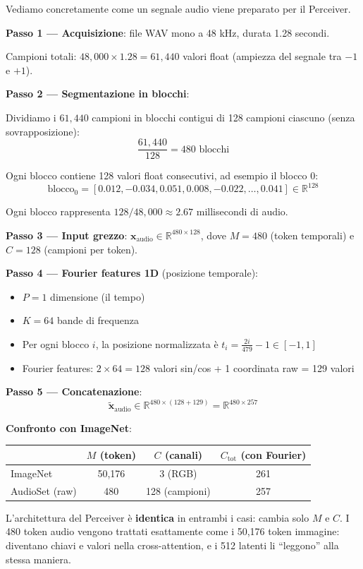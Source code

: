\documentclass[12pt,a4paper]{article}
\begin{document}
\begin{examplebox}
Vediamo concretamente come un segnale audio viene preparato per il Perceiver.

\textbf{Passo 1 --- Acquisizione}: file WAV mono a 48 kHz, durata 1.28 secondi.

Campioni totali: $48{,}000 \times 1.28 = 61{,}440$ valori float (ampiezza del segnale tra $-1$ e $+1$).

\textbf{Passo 2 --- Segmentazione in blocchi}:

Dividiamo i $61{,}440$ campioni in blocchi contigui di 128 campioni ciascuno (senza sovrapposizione):
\[
\frac{61{,}440}{128} = 480 \text{ blocchi}
\]

Ogni blocco contiene 128 valori float consecutivi, ad esempio il blocco 0:
\[
\text{blocco}_0 = [0.012, -0.034, 0.051, 0.008, -0.022, \ldots, 0.041] \in \mathbb{R}^{128}
\]

Ogni blocco rappresenta $128 / 48{,}000 \approx 2.67$ millisecondi di audio.

\textbf{Passo 3 --- Input grezzo}: $\mathbf{x}_{\text{audio}} \in \mathbb{R}^{480 \times 128}$, dove $M = 480$ (token temporali) e $C = 128$ (campioni per token).

\textbf{Passo 4 --- Fourier features 1D} (posizione temporale):
\begin{itemize}
\item $P = 1$ dimensione (il tempo)
\item $K = 64$ bande di frequenza
\item Per ogni blocco $i$, la posizione normalizzata \`e $t_i = \frac{2i}{479} - 1 \in [-1, 1]$
\item Fourier features: $2 \times 64 = 128$ valori sin/cos + 1 coordinata raw = 129 valori
\end{itemize}

\textbf{Passo 5 --- Concatenazione}:
\[
\tilde{\mathbf{x}}_{\text{audio}} \in \mathbb{R}^{480 \times (128 + 129)} = \mathbb{R}^{480 \times 257}
\]

\textbf{Confronto con ImageNet}:
\begin{center}
\begin{tabular}{@{}lccc@{}}
\toprule
& $M$ (token) & $C$ (canali) & $C_{\text{tot}}$ (con Fourier) \\
\midrule
ImageNet & 50{,}176 & 3 (RGB) & 261 \\
AudioSet (raw) & 480 & 128 (campioni) & 257 \\
\bottomrule
\end{tabular}
\end{center}

L'architettura del Perceiver \`e \textbf{identica} in entrambi i casi: cambia solo $M$ e $C$. I 480 token audio vengono trattati esattamente come i 50{,}176 token immagine: diventano chiavi e valori nella cross-attention, e i 512 latenti li ``leggono'' alla stessa maniera.
\end{examplebox}
\end{document}
